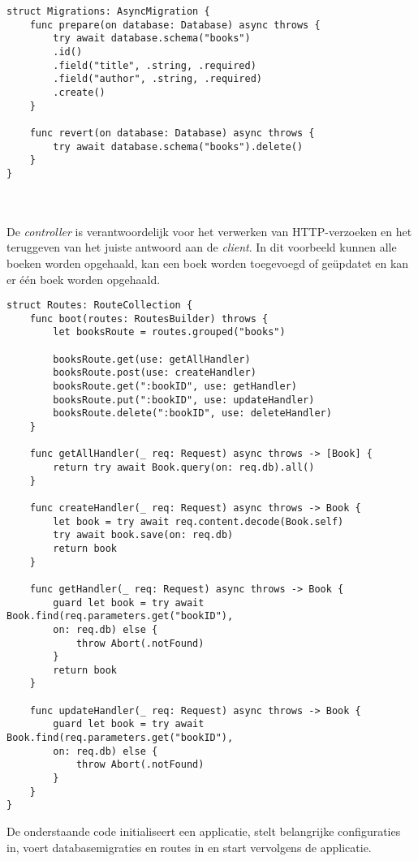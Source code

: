 \begin{lstlisting}[caption=Vapor example - Migrations]
struct Migrations: AsyncMigration {
    func prepare(on database: Database) async throws {
        try await database.schema("books")
        .id()
        .field("title", .string, .required)
        .field("author", .string, .required)
        .create()
    }
    
    func revert(on database: Database) async throws {
        try await database.schema("books").delete()
    }
}
\end{lstlisting}
\\  \\
De \textit{controller} is verantwoordelijk voor het verwerken van HTTP-verzoeken en het teruggeven van het juiste antwoord aan de \textit{client}. In dit voorbeeld kunnen alle boeken worden opgehaald, kan een boek worden toegevoegd of geüpdatet en kan er één boek worden opgehaald. 

\begin{lstlisting}[caption=Vapor example - Controller]
 struct Routes: RouteCollection {
    func boot(routes: RoutesBuilder) throws {
        let booksRoute = routes.grouped("books")
        
        booksRoute.get(use: getAllHandler)
        booksRoute.post(use: createHandler)
        booksRoute.get(":bookID", use: getHandler)
        booksRoute.put(":bookID", use: updateHandler)
        booksRoute.delete(":bookID", use: deleteHandler)
    }
    
    func getAllHandler(_ req: Request) async throws -> [Book] {
        return try await Book.query(on: req.db).all()
    }
    
    func createHandler(_ req: Request) async throws -> Book {
        let book = try await req.content.decode(Book.self)
        try await book.save(on: req.db)
        return book
    }
    
    func getHandler(_ req: Request) async throws -> Book {
        guard let book = try await Book.find(req.parameters.get("bookID"), 
        on: req.db) else {
            throw Abort(.notFound)
        }
        return book
    }
    
    func updateHandler(_ req: Request) async throws -> Book {
        guard let book = try await Book.find(req.parameters.get("bookID"), 
        on: req.db) else {
            throw Abort(.notFound)
        }
    }
}
\end{lstlisting}

De onderstaande code initialiseert een applicatie, stelt belangrijke configuraties in, voert databasemigraties en routes in en start vervolgens de applicatie. 

